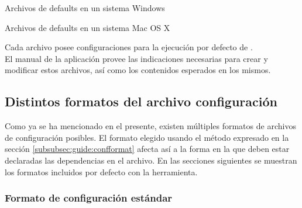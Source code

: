 \begin{folders}[h]
	\caption{Archivos de defaults en un sistema Windows}
	\label{folders:conf:windows}
\end{folders}

\begin{folders}[h]
	\caption{Archivos de defaults en un sistema Mac OS X}
	\label{folders:conf:osx}
\end{folders}

Cada archivo posee configuraciones para la ejecución por defecto de 
\fronttier.\\
El manual de la aplicación provee las indicaciones necesarias para crear y 
modificar estos archivos, así como los contenidos esperados en los mismos.


\subsection{Distintos formatos del archivo configuración}
\label{subsec:formats}

Como ya se ha mencionado en el presente, existen múltiples formatos de archivos
de configuración posibles. El formato elegido usando el método expresado en la
sección \ref{subsubsec:guide:confformat} afecta así a la forma en la que deben
estar declaradas las dependencias en el archivo. En las secciones siguientes
se muestran los formatos incluidos por defecto con la herramienta.

\subsubsection{Formato de configuración estándar}
\label{subsubsec:formats:standar}

